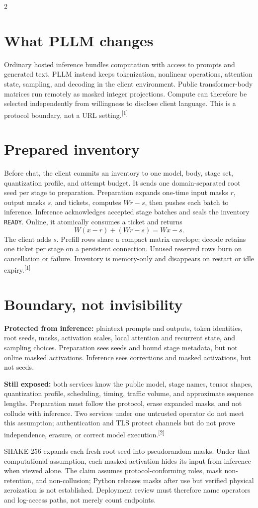 \documentclass[10pt,letterpaper]{article}
\newcommand{\refmark}[1]{\textsuperscript{\textcolor{pllmGreen}{[#1]}}}
\begin{document}
\vspace{1pt}
\begin{multicols}{2}
\section*{What PLLM changes}
Ordinary hosted inference bundles computation with access to prompts and generated text. PLLM instead keeps tokenization, nonlinear operations, attention state, sampling, and decoding in the client environment. Public transformer-body matrices run remotely as masked integer projections. Compute can therefore be selected independently from willingness to disclose client language. This is a protocol boundary, not a URL setting.\refmark{1}

\section*{Prepared inventory}
Before chat, the client commits an inventory to one model, body, stage set, quantization profile, and attempt budget. It sends one domain-separated root seed per stage to preparation. Preparation expands one-time input masks $r$, output masks $s$, and tickets, computes $Wr-s$, then pushes each batch to inference. Inference acknowledges accepted stage batches and seals the inventory \texttt{READY}. Online, it atomically consumes a ticket and returns
\[
W(x-r)+(Wr-s)=Wx-s.
\]
The client adds $s$. Prefill rows share a compact matrix envelope; decode retains one ticket per stage on a persistent connection. Unused reserved rows burn on cancellation or failure. Inventory is memory-only and disappears on restart or idle expiry.\refmark{1}

\columnbreak
\section*{Boundary, not invisibility}
\textbf{Protected from inference:} plaintext prompts and outputs, token identities, root seeds, masks, activation scales, local attention and recurrent state, and sampling choices. Preparation sees seeds and bound stage metadata, but not online masked activations. Inference sees corrections and masked activations, but not seeds.

\textbf{Still exposed:} both services know the public model, stage names, tensor shapes, quantization profile, scheduling, timing, traffic volume, and approximate sequence lengths. Preparation must follow the protocol, erase expanded masks, and not collude with inference. Two services under one untrusted operator do not meet this assumption; authentication and TLS protect channels but do not prove independence, erasure, or correct model execution.\refmark{2}

SHAKE-256 expands each fresh root seed into pseudorandom masks. Under that computational assumption, each masked activation hides its input from inference when viewed alone. The claim assumes protocol-conforming roles, mask non-retention, and non-collusion; Python releases masks after use but verified physical zeroization is not established. Deployment review must therefore name operators and log-access paths, not merely count endpoints.
\end{multicols}
\end{document}

